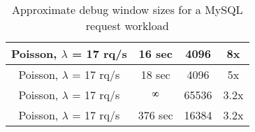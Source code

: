 \begin{table}[ht]
\begin{centering}
\begin{tabular}{|c|c|c|c|}
			Poisson, $\lambda$ = 17 rq/s                               & 16 sec                                                 & 4096                                                & 8x                        \\ \hline
			Poisson, $\lambda$ = 17 rq/s                               & 18 sec                                                 & 4096                                                & 5x                      \\ \hline
			Poisson, $\lambda$ = 17 rq/s                               & $\infinity$                                                    & 65536                                               & 3.2x \\ \hline
			Poisson, $\lambda$ = 17 rq/s                               & 376 sec                                                & 16384                                               & 3.2x \\ \hline
		\end{tabular}
		\captionsetup{justification=centering}
		\caption{Approximate debug window sizes for a MySQL request workload}
		\label{table:timewindow}
	\end{centering}
\end{table}
\fi


